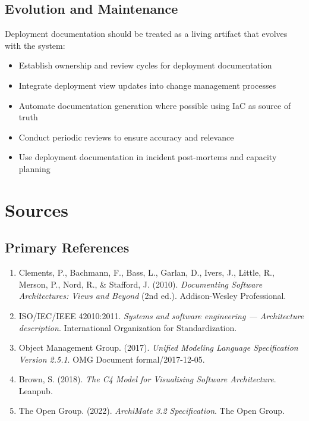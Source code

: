 \documentclass[11pt,letterpaper]{article}
\begin{document}
\subsection{Evolution and Maintenance}

Deployment documentation should be treated as a living artifact that evolves with the system:

\begin{itemize}
    \item Establish ownership and review cycles for deployment documentation
    \item Integrate deployment view updates into change management processes
    \item Automate documentation generation where possible using IaC as source of truth
    \item Conduct periodic reviews to ensure accuracy and relevance
    \item Use deployment documentation in incident post-mortems and capacity planning
\end{itemize}

\section{Sources}

\subsection{Primary References}

\begin{enumerate}
    \item Clements, P., Bachmann, F., Bass, L., Garlan, D., Ivers, J., Little, R., Merson, P., Nord, R., \& Stafford, J. (2010). \textit{Documenting Software Architectures: Views and Beyond} (2nd ed.). Addison-Wesley Professional.
    
    \item ISO/IEC/IEEE 42010:2011. \textit{Systems and software engineering --- Architecture description}. International Organization for Standardization.
    
    \item Object Management Group. (2017). \textit{Unified Modeling Language Specification Version 2.5.1}. OMG Document formal/2017-12-05.
    
    \item Brown, S. (2018). \textit{The C4 Model for Visualising Software Architecture}. Leanpub.
    
    \item The Open Group. (2022). \textit{ArchiMate 3.2 Specification}. The Open Group.
\end{enumerate}
\end{document}
